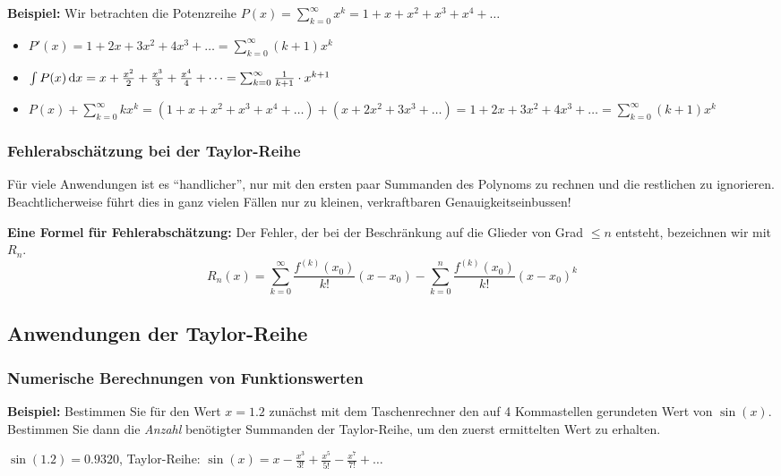 \textbf{Beispiel:} Wir betrachten die Potenzreihe $P(x) = \sum_{k=0}^{\infty} x^k = 1 + x + x^2 + x^3 + x^4 + \dots$
\begin{itemize}
    \item $P'(x) = 1 + 2x + 3x^2 + 4x^3 + \dots = \sum_{k=0}^{\infty} (k + 1)x^k$
    \item $\int P(x) \,\mathrm{d}x = x + \frac{x^2}{2} + \frac{x^3}{3} + \frac{x^4}{4} + \dots = \sum_{k=0}^{\infty} \frac{1}{k + 1} \cdot x^{k + 1}$
    \item $P(x) + \sum_{k=0}^{\infty} kx^k = (1 + x + x^2 + x^3 + x^4 + \dots) + (x + 2x^2 + 3x^3 + \dots) = 1 + 2x + 3x^2 + 4x^3 + \dots = \sum_{k=0}^{\infty} (k + 1)x^k$
\end{itemize}

\subsubsection{Fehlerabschätzung bei der Taylor-Reihe}

Für viele Anwendungen ist es ``handlicher'', nur mit den ersten paar Summanden des Polynoms zu rechnen und die restlichen zu ignorieren.
Beachtlicherweise führt dies in ganz vielen Fällen nur zu kleinen, verkraftbaren Genauigkeitseinbussen!

\textbf{Eine Formel für Fehlerabschätzung:} Der Fehler, der bei der Beschränkung auf die Glieder von Grad $\leq n$ entsteht, bezeichnen wir mit $R_n$. \[R_n(x) = \sum_{k=0}^{\infty} \frac{f^{(k)}(x_0)}{k!} (x - x_0) - \sum_{k=0}^{n} \frac{f^{(k)}(x_0)}{k!} (x - x_0)^k\]

\subsection{Anwendungen der Taylor-Reihe}\label{subsec:anwendungen-der-taylor-reihe}

\subsubsection{Numerische Berechnungen von Funktionswerten}

\textbf{Beispiel:} Bestimmen Sie für den Wert $x=1.2$ zunächst mit dem Taschenrechner den auf 4 Kommastellen gerundeten Wert von $\sin(x)$.
Bestimmen Sie dann die \emph{Anzahl} benötigter Summanden der Taylor-Reihe, um den zuerst ermittelten Wert zu erhalten.

$\sin(1.2) = 0.9320$, Taylor-Reihe: $\sin(x) = x - \frac{x^3}{3!} + \frac{x^5}{5!} - \frac{x^7}{7!} + \dots$

